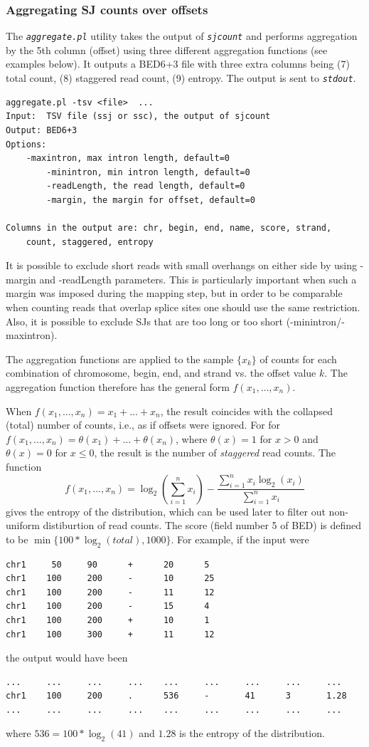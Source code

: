 \documentclass{article}
\newcommand{\prog}[1]{{\tt\em #1}}
\begin{document}

\subsubsection{Aggregating SJ counts over offsets}
The \prog{aggregate.pl} utility takes the output of \prog{sjcount} and performs aggregation by the 5th column (offset) using three different aggregation functions 
(see examples below). It outputs a BED6+3 file with three extra columns being (7) total count, (8) staggered read count, (9) entropy. The output is sent to \prog{stdout}. 
\begin{verbatim}
aggregate.pl -tsv <file>  ...
Input:	TSV file (ssj or ssc), the output of sjcount
Output:	BED6+3
Options:
	-maxintron, max intron length, default=0
        -minintron, min intron length, default=0
        -readLength, the read length, default=0
        -margin, the margin for offset, default=0

Columns in the output are: chr, begin, end, name, score, strand, 
	count, staggered, entropy
\end{verbatim}
It is possible to exclude short reads with small overhangs on either side by using -margin and -readLength parameters. This is particularly important when such a margin 
was imposed during the mapping step, but in order to be comparable when counting reads that overlap splice sites one should use the same restriction. Also, it is possible 
to exclude SJs that are too long or too short (-minintron/-maxintron).

The aggregation functions are applied to the sample $\{x_k\}$ of counts for each combination of chromosome, begin, end, and strand vs. the offset value $k$. 
The aggregation function therefore has the general form $f(x_1,\dots,x_n)$. 

When $f(x_1,\dots,x_n) = x_1+\dots+x_n$, the result coincides with the collapsed (total) number of counts, i.e., as if offsets were ignored.
For for $f(x_1,\dots,x_n) = \theta(x_1)+\dots+\theta(x_n)$, where $\theta(x)=1$ for $x>0$ and $\theta(x)=0$ for $x\le0$, the result is the 
number of {\em staggered} read counts. The function 
$$f(x_1,\dots,x_n) = \log_2(\sum\limits_{i=1}^nx_i) - \frac{\sum\limits_{i=1}^nx_i\log_2(x_i)}{\sum\limits_{i=1}^nx_i}$$ 
gives the entropy of the distribution, which can be used later to filter out non-uniform distiburtion of read counts. The score (field number 5 of BED) is 
defined to be $\min\{100*\log_2(total), 1000\}$. For example, if the input were
\begin{verbatim}
chr1     50     90      +      20      5
chr1    100     200     -      10      25
chr1    100     200     -      11      12
chr1    100     200     -      15      4
chr1    100     200     +      10      1
chr1    100     300     +      11      12
\end{verbatim}
the output would have been
\begin{verbatim}
...     ...     ...     ...    ...     ...     ...     ...     ...
chr1    100     200     .      536     -       41      3       1.28
...     ...     ...     ...    ...     ...     ...     ...     ...
\end{verbatim}
where $536=100*\log_2(41)$ and $1.28$ is the entropy of the distribution.
\end{document}
